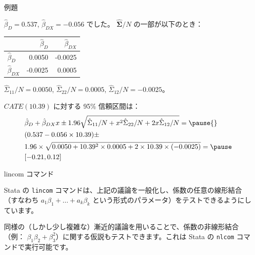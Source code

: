 \documentclass[11pt,handout]{beamer}
\newenvironment{wideitemize}{\itemize\addtolength{\itemsep}{10pt}}{\enditemize}
\newenvironment{wideitemizeshort}{\itemize}{\enditemize}
\begin{document}
\begin{frame}{例題}
\begin{wideitemizeshort}
\item
$\hat\beta_D = 0.537$, $\hat\beta_{DX} = -0.056$ でした。 $\bm{\hat\Sigma}/N$ の一部が以下のとき：

\begin{tabular}{l|rr}
& $\hat\beta_{D}$ & $\hat\beta_{DX}$ \\ \hline 
$\hat\beta_{D}$  & 0.0050  & -0.0025 \\
$\hat\beta_{DX}$ & -0.0025 & 0.0005
\end{tabular}
 
 \pause
 \item
 $\hat\Sigma_{11}/N = 0.0050$, $\hat\Sigma_{22}/N = 0.0005$, $\hat\Sigma_{12}/N = -0.0025$。
 
 \pause
 \item
 $CATE(10.39)$ に対する 95\% 信頼区間は： \pause{}
{\small \begin{align*}
&\hat\beta_{D} + \hat\beta_{DX} x \pm  1.96 \sqrt{ \hat\Sigma_{11}/N + x^2 \hat\Sigma_{22}/N +   2x \hat\Sigma_{12}/N } = \pause{} \\
&(0.537-0.056 \times 10.39) \pm \\ &1.96 \times \sqrt{  0.0050 + 10.39^2 \times 0.0005 + 2 \times 10.39 \times (-0.0025)  } = \pause \\
&[-0.21, 0.12]
\end{align*} }
 
\end{wideitemizeshort}	
	
\end{frame}


\begin{frame}{lincom コマンド}
	\begin{wideitemize}
		\item
		Stata の \texttt{lincom} コマンドは、上記の議論を一般化し、係数の任意の線形結合（すなわち $a_1 \beta_1 + \dots + a_k \beta_k$ という形式のパラメータ）をテストできるようにしています。
		

		\pause
		\item
		同様の（しかし少し複雑な）漸近的議論を用いることで、係数の非線形結合（例： $\beta_1 \beta_2 + \beta_3^2$）に関する仮説もテストできます。これは Stata の \texttt{nlcom} コマンドで実行可能です。
	\end{wideitemize}
\end{frame}
\end{document}
